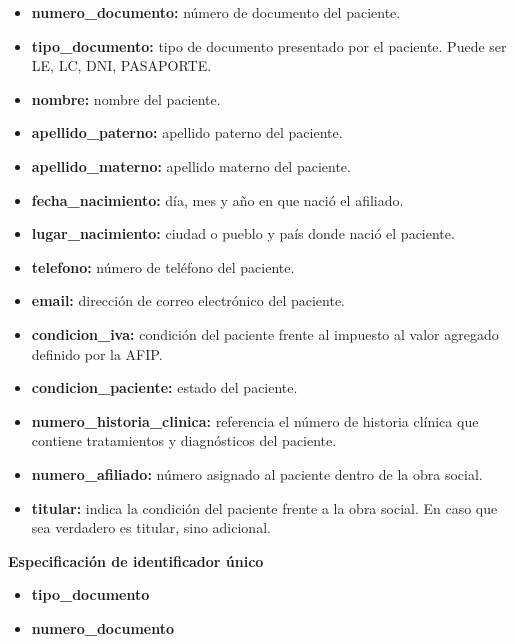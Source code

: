 \documentclass[a4paper,11pt]{article}
\begin{document}
\begin{itemize}

   \item \textbf{numero\_documento:} número de documento del paciente.

   \item \textbf{tipo\_documento:} tipo de documento presentado por el paciente. Puede ser 
   LE, LC, DNI, PASAPORTE.

   \item \textbf{nombre:} nombre del paciente.

   \item \textbf{apellido\_paterno:} apellido paterno del paciente.

   \item \textbf{apellido\_materno:} apellido materno del paciente.

   \item \textbf{fecha\_nacimiento:} día, mes y año en que nació el afiliado.

   \item \textbf{lugar\_nacimiento:} ciudad o pueblo y país donde nació el paciente.

   \item \textbf{telefono:} número de teléfono del paciente.

   \item \textbf{email:} dirección de correo electrónico del paciente.

   \item \textbf{condicion\_iva:} condición del paciente frente al impuesto al valor agregado 
   definido por la AFIP.

   \item \textbf{condicion\_paciente:} estado del paciente.

   \item \textbf{numero\_historia\_clinica:} referencia el número de historia clínica que 
   contiene tratamientos y diagnósticos del paciente.

   \item \textbf{numero\_afiliado:} número asignado al paciente dentro de la obra social.

   \item \textbf{titular:} indica la condición del paciente frente a la obra social. En caso que sea verdadero 
   es titular, sino adicional.
\end{itemize}

\textbf{Especificación de identificador único}

\begin{itemize}

    \item \textbf{tipo\_documento}

    \item \textbf{numero\_documento}

\end{itemize}
\end{document}
